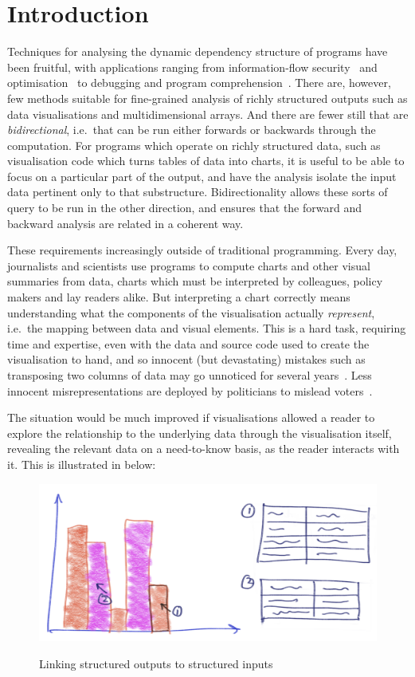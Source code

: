 \section{Introduction}

Techniques for analysing the dynamic dependency structure of programs have been fruitful, with applications ranging from information-flow security~\cite{sabelfeld03} and optimisation~\cite{kildall73} to debugging and program comprehension~\cite{weiser81,delucia96}. There are, however, few methods suitable for fine-grained analysis of richly structured outputs such as data visualisations and multidimensional arrays. And there are fewer still that are \emph{bidirectional}, i.e.~that can be run either forwards or backwards through the computation. For programs which operate on richly structured data, such as visualisation code which turns tables of data into charts, it is useful to be able to focus on a particular part of the output, and have the analysis isolate the input data pertinent only to that substructure. Bidirectionality allows these sorts of query to be run in the other direction, and ensures that the forward and backward analysis are related in a coherent way.

These requirements increasingly outside of traditional programming. Every day, journalists and scientists use programs to compute charts and other visual summaries from data, charts which must be interpreted by colleagues, policy makers and lay readers alike. But interpreting a chart correctly means understanding what the components of the visualisation actually \emph{represent}, i.e.~the mapping between data and visual elements. This is a hard task, requiring time and expertise, even with the data and source code used to create the visualisation to hand, and so innocent (but devastating) mistakes such as transposing two columns of data may go unnoticed for several years~\cite{miller06}. Less innocent misrepresentations are deployed by politicians to mislead voters~\cite{fullfact19}.

The situation would be much improved if visualisations allowed a reader to explore the relationship to the underlying data through the visualisation itself, revealing the relevant data on a need-to-know basis, as the reader interacts with it. This is illustrated in  below:

\begin{figure}[H]
   {\includegraphics[scale=0.05]{fig/example/data-linking.png}}
   \caption{Linking structured outputs to structured inputs}
   \label{fig:introduction:data-linking}
\end{figure}


